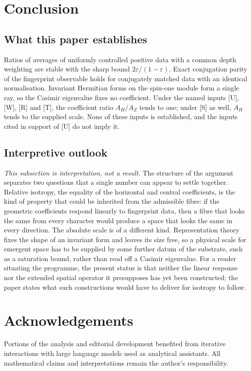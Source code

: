 \documentclass[12pt,a4paper]{article}
\theoremstyle{definition}
\theoremstyle{remark}
\begin{document}
  \section{Conclusion}\label{sec:conclusion}

    \subsection{What this paper establishes}

      Ratios of averages of uniformly controlled positive data with a common depth weighting are stable with the sharp
      bound $2\varepsilon/(1-\varepsilon)$.
      Exact conjugation parity of the fingerprint observable holds for conjugately matched data with an identical
      normalisation.
      Invariant Hermitian forms on the spin-one module form a single ray, so the Casimir eigenvalue fixes no
      coefficient.
      Under the named inputs [U], [W], [R] and [T], the coefficient ratio $A_H/A_Z$ tends to one; under [S] as well,
      $A_H$ tends to the supplied scale.
      None of these inputs is established, and the inputs cited in support of [U] do not imply it.

    \subsection{Interpretive outlook}

      \emph{This subsection is interpretation, not a result.}
      The structure of the argument separates two questions that a single number can appear to settle together.
      Relative isotropy, the equality of the horizontal and central coefficients, is the kind of property that could
      be inherited from the admissible fibre: if the geometric coefficients respond linearly to fingerprint data,
      then a fibre that looks the same from every character would produce a space that looks the same in every
      direction.
      The absolute scale is of a different kind.
      Representation theory fixes the shape of an invariant form and leaves its size free, so a physical scale for
      emergent space has to be supplied by some further datum of the substrate, such as a saturation bound, rather
      than read off a Casimir eigenvalue.
      For a reader situating the programme, the present status is that neither the linear response nor the
      extended spatial operator it presupposes has yet been constructed; the paper states what such constructions
      would have to deliver for isotropy to follow.

  \section*{Acknowledgements}

    Portions of the analysis and editorial development benefited from iterative interactions with large language
    models used as analytical assistants.
    All mathematical claims and interpretations remain the author's responsibility.

  \clearpage
  {\raggedright
  
  }
\end{document}
